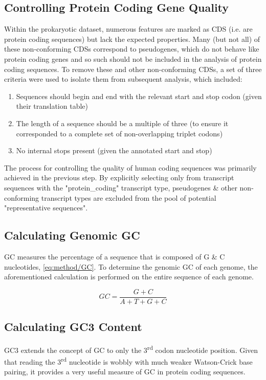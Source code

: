 \documentclass[../main.tex]{subfile}
\begin{document}
    \subsection{Controlling Protein Coding Gene Quality}
        Within the prokaryotic dataset, numerous features are marked as CDS (i.e. are protein coding sequences) but lack the expected properties. Many (but not all) of these non-conforming CDSs correspond to pseudogenes, which do not behave like protein coding genes and so such should not be included in the analysis of protein coding sequences. To remove these and other non-conforming CDSs, a set of three criteria were used to isolate them from subsequent analysis, which included:
        \begin{enumerate}
            \item Sequences should begin and end with the relevant start and stop codon (given their translation table)
            \item The length of a sequence should be a multiple of three (to ensure it corresponded to a complete set of non-overlapping triplet codons)
            \item No internal stops present (given the annotated start and stop)
        \end{enumerate}

        The process for controlling the quality of human coding sequences was primarily achieved in the previous step. By explicitly selecting only from transcript sequences with the "protein\_coding" transcript type, pseudogenes \& other non-conforming transcript types are excluded from the pool of potential "representative sequences".
    \subsection{Calculating Genomic GC}
        GC measures the percentage of a sequence that is composed of G \& C nucleotides, \cref{eq:method/GC}. To determine the genomic GC of each genome, the aforementioned calculation is performed on the entire sequence of each genome.

        \begin{equation}
            GC = \frac{G + C}{A + T + G + C} \label{eq:method/GC}
        \end{equation}
    \subsection{Calculating GC3 Content}
        GC3 extends the concept of GC to only the 3\textsuperscript{rd} codon nucleotide position. Given that reading the 3\textsuperscript{rd} nucleotide is wobbly with much weaker Watson-Crick base pairing, it provides a very useful measure of GC in protein coding sequences.
\end{document}

